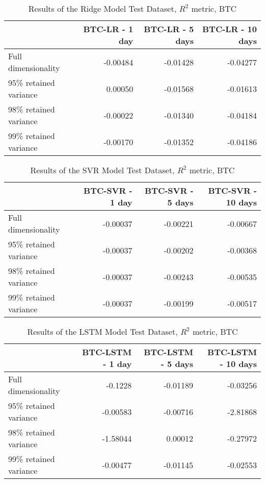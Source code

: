 \begin{table}[htbp]
    \centering
    \caption{Results of the Ridge Model Test Dataset, $R^2$ metric, BTC}
\begin{tabular}{lrrr}
    \toprule
    {} &  BTC-LR - 1 day &  BTC-LR - 5 days &  BTC-LR - 10 days\\
    \midrule
    Full dimensionality   &        -0.00484 &         -0.01428 &          -0.04277 \\
    95\% retained variance &         0.00050 &         -0.01568 &          -0.01613\\
    98\% retained variance &        -0.00022 &         -0.01340 &          -0.04184\\
    99\% retained variance &        -0.00170 &         -0.01352 &          -0.04186\\
    \bottomrule
    \end{tabular}
\end{table}

\begin{table}[htbp]
    \centering
    \caption{Results of the SVR Model Test Dataset, $R^2$ metric, BTC}
\begin{tabular}{lrrr}
    \toprule
    {} &  BTC-SVR - 1 day &  BTC-SVR - 5 days &  BTC-SVR - 10 days\\
    \midrule
    Full dimensionality     &  -0.00037 &          -0.00221 &           -0.00667 \\
    95\% retained variance   &  -0.00037 &          -0.00202 &           -0.00368\\
    98\% retained variance   &  -0.00037 &          -0.00243 &           -0.00535\\
    99\% retained variance   &  -0.00037 &          -0.00199 &           -0.00517\\
    \bottomrule
\end{tabular}
\end{table}

\begin{table}[htbp]
    \centering
    \caption{Results of the LSTM Model Test Dataset, $R^2$ metric, BTC}
\begin{tabular}{lrrr}
    \toprule
    {} &  BTC-LSTM - 1 day &  BTC-LSTM - 5 days &  BTC-LSTM - 10 days \\
    \midrule
    Full dimensionality   &    -0.1228   &     -0.01189      &     -0.03256      \\
    95\% retained variance &   -0.00583    &     -0.00716      &   -2.81868         \\
    98\% retained variance &   -1.58044    &    0.00012      &   -0.27972         \\
    99\% retained variance &  -0.00477    &     -0.01145  &    -0.02553      \\
    \bottomrule
\end{tabular}
\end{table}

